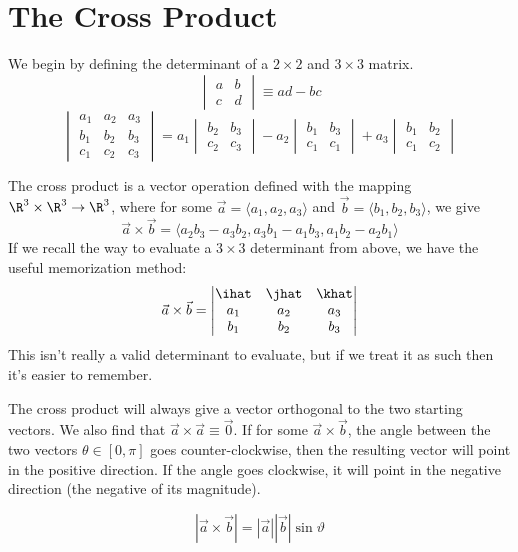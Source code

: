 \section{The Cross Product}
We begin by defining the determinant of a $2\times2$ and $3\times3$ matrix.
$$\begin{vmatrix}
	a&b\\c&d
\end{vmatrix}\equiv ad-bc$$
$$\begin{vmatrix}
	a_1&a_2&a_3\\b_1&b_2&b_3\\c_1&c_2&c_3
\end{vmatrix}=a_1\begin{vmatrix}
b_2&b_3\\c_2&c_3
\end{vmatrix}-a_2\begin{vmatrix}
b_1&b_3\\c_1&c_1
\end{vmatrix}+a_3\begin{vmatrix}
b_1&b_2\\c_1&c_2
\end{vmatrix}$$
\begin{definition}\label{def:1}
	The cross product is a vector operation defined with the mapping $\R^3\times\R^3\rightarrow\R^3$, where for some $\vec{a}=\langle a_1,a_2,a_3\rangle$ and $\vec{b}=\langle b_1,b_2,b_3\rangle$, we give
	$$\vec{a}\times\vec{b}=\langle a_2b_3-a_3b_2,a_3b_1-a_1b_3,a_1b_2-a_2b_1\rangle$$
	If we recall the way to evaluate a $3\times3$ determinant from above, we have the useful memorization method:
	$$\vec{a}\times\vec{b}=\begin{vmatrix}
		\ihat&\jhat&\khat\\
		a_1&a_2&a_3\\
		b_1&b_2&b_3
	\end{vmatrix}$$
	This isn't really a valid determinant to evaluate, but if we treat it as such then it's easier to remember.
\end{definition}
The cross product will always give a vector orthogonal to the two starting vectors. We also find that $\vec{a}\times\vec{a}\equiv\vec{0}$. If for some $\vec{a}\times\vec{b}$, the angle between the two vectors $\theta\in[0,\pi]$ goes counter-clockwise, then the resulting vector will point in the positive direction. If the angle goes clockwise, it will point in the negative direction (the negative of its magnitude).
\begin{theorem}\label{thm:1}
	$$|\vec{a}\times\vec{b}|=|\vec{a}||\vec{b}|\sin\vartheta$$
\end{theorem}
